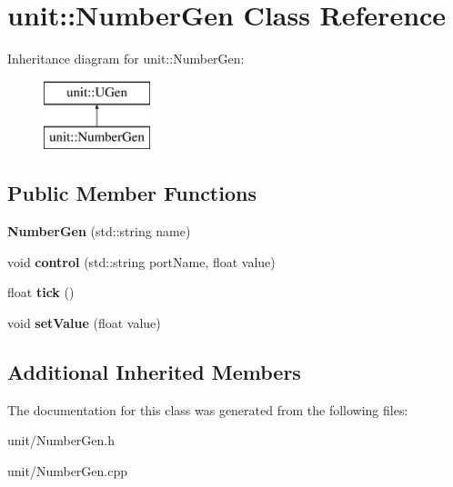 \hypertarget{classunit_1_1NumberGen}{}\section{unit\+:\+:Number\+Gen Class Reference}
\label{classunit_1_1NumberGen}
Inheritance diagram for unit\+:\+:Number\+Gen\+:\begin{figure}[H]
\begin{center}
\leavevmode
\includegraphics[height=2.000000cm]{classunit_1_1NumberGen}
\end{center}
\end{figure}
\subsection*{Public Member Functions}
\begin{DoxyCompactItemize}
\item 
{\bfseries Number\+Gen} (std\+::string name)\hypertarget{classunit_1_1NumberGen_a6e93812c4805a43f19f8fb11680e32a4}{}\label{classunit_1_1NumberGen_a6e93812c4805a43f19f8fb11680e32a4}

\item 
void {\bfseries control} (std\+::string port\+Name, float value)\hypertarget{classunit_1_1NumberGen_a9daaaf8a12389873494bb1ad2f877c8c}{}\label{classunit_1_1NumberGen_a9daaaf8a12389873494bb1ad2f877c8c}

\item 
float {\bfseries tick} ()\hypertarget{classunit_1_1NumberGen_a38cef7d64a12e40bf2ae14f29def41ca}{}\label{classunit_1_1NumberGen_a38cef7d64a12e40bf2ae14f29def41ca}

\item 
void {\bfseries set\+Value} (float value)\hypertarget{classunit_1_1NumberGen_ad5c107c90a5bc6cf7bbc39562db9d9e3}{}\label{classunit_1_1NumberGen_ad5c107c90a5bc6cf7bbc39562db9d9e3}

\end{DoxyCompactItemize}
\subsection*{Additional Inherited Members}


The documentation for this class was generated from the following files\+:\begin{DoxyCompactItemize}
\item 
unit/Number\+Gen.\+h\item 
unit/Number\+Gen.\+cpp\end{DoxyCompactItemize}
